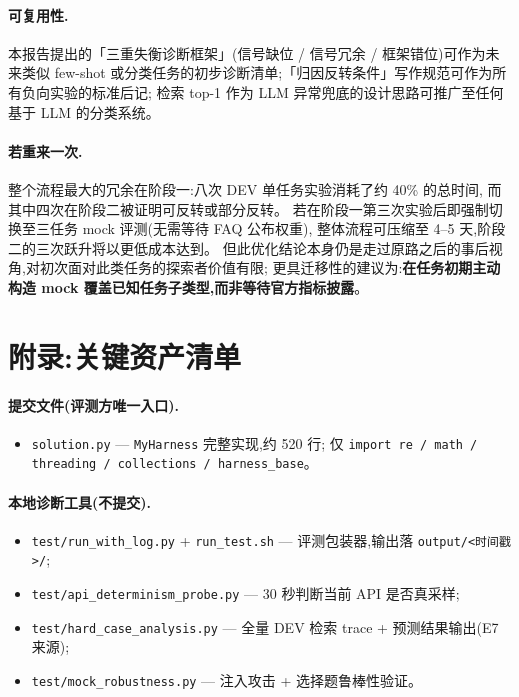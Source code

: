 \documentclass[11pt,a4paper]{ctexart}
\begin{document}
\paragraph{可复用性.}本报告提出的「三重失衡诊断框架」(信号缺位 / 信号冗余 / 框架错位)可作为未来类似
few-shot 或分类任务的初步诊断清单;「归因反转条件」写作规范可作为所有负向实验的标准后记;
检索 top-1 作为 LLM 异常兜底的设计思路可推广至任何基于 LLM 的分类系统。

\paragraph{若重来一次.}整个流程最大的冗余在阶段一:八次 DEV 单任务实验消耗了约 40\% 的总时间,
而其中四次在阶段二被证明可反转或部分反转。
若在阶段一第三次实验后即强制切换至三任务 mock 评测(无需等待 FAQ 公布权重),
整体流程可压缩至 4--5 天,阶段二的三次跃升将以更低成本达到。
但此优化结论本身仍是走过原路之后的事后视角,对初次面对此类任务的探索者价值有限;
更具迁移性的建议为:\textbf{在任务初期主动构造 mock 覆盖已知任务子类型,而非等待官方指标披露}。

\appendix
\section*{附录:关键资产清单}

\paragraph{提交文件(评测方唯一入口).}
\begin{itemize}[leftmargin=2em,itemsep=0.1em]
\item \texttt{solution.py} --- \texttt{MyHarness} 完整实现,约 520 行;
  仅 \texttt{import re / math / threading / collections / harness\_base}。
\end{itemize}

\paragraph{本地诊断工具(不提交).}
\begin{itemize}[leftmargin=2em,itemsep=0.1em]
\item \texttt{test/run\_with\_log.py} + \texttt{run\_test.sh} --- 评测包装器,输出落 \texttt{output/<时间戳>/};
\item \texttt{test/api\_determinism\_probe.py} --- 30 秒判断当前 API 是否真采样;
\item \texttt{test/hard\_case\_analysis.py} --- 全量 DEV 检索 trace + 预测结果输出(E7 来源);
\item \texttt{test/mock\_robustness.py} --- 注入攻击 + 选择题鲁棒性验证。
\end{itemize}
\end{document}

